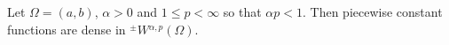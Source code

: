 \documentclass[leqno,final]{siamltex}
\numberwithin{equation}{section}
\newcommand{\eps}{\varepsilon}
\renewcommand{\(}{\bigl(}
\renewcommand{\)}{\bigr)}
\begin{document}

    \begin{theorem}
        Let $\Omega=(a,b)$,  $ \alpha >0 $ and $1 \leq p <\infty$ so that $\alpha p  <1$. Then piecewise constant functions are dense in $^{{\pm}}{W}{^{\alpha,p}}(\Omega)$.
    \end{theorem}
\end{document}
